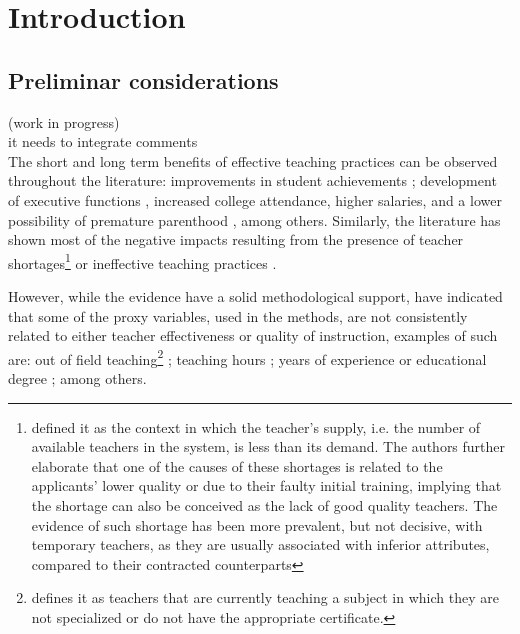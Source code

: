 \chapter{Introduction}

\section{Preliminar considerations}

{\color{red} (work in progress) \\
	it needs to integrate comments \\
	
The short and long term benefits of effective teaching practices can be observed throughout the literature: improvements in student achievements \citet{Rockoff_2004, Rivkin_et_al_2005, Duflo_et_al_2009, Hanushek_et_al_2012, Muralidharan_et_al_2013, Chetty_et_al_2014a, Araujo_et_al_2016}; development of executive functions \cite{Araujo_et_al_2016}, increased college attendance, higher salaries, and a lower possibility of premature parenthood \cite{Chetty_et_al_2014b}, among others. Similarly, the literature has shown most of the negative impacts resulting from the presence of teacher shortages\footnote{\citet{Bertoni_et_al_2020a} defined it as the context in which the teacher's supply, i.e. the number of available teachers in the system, is less than its demand. The authors further elaborate that one of the causes of these shortages is related to the applicants' lower quality or due to their faulty initial training, implying that the shortage can also be conceived as the lack of good quality teachers. The evidence of such shortage has been more prevalent, but not decisive, with temporary teachers, as they are usually associated with inferior attributes, compared to their contracted counterparts} \cite{Duflo_et_al_2009, Muralidharan_et_al_2013, Duflo_et_al_2015, Ayala_2017, Marotta_2019} or ineffective teaching practices \cite{Hanushek_et_al_2012}.

However, while the evidence have a solid methodological support, \citet{Hanushek_et_al_2006} have indicated that some of the proxy variables, used in the methods, are not consistently related to either teacher effectiveness or quality of instruction, examples of such are: out of field teaching\footnote{\citet{Medeiros_et_al_2018} defines it as teachers that are currently teaching a subject in which they are not specialized or do not have the appropriate certificate.} \cite{Ingersoll_1998, Dee_et_al_2008, Bertoni_et_al_2020a}; teaching hours \cite{Bruns_et_al_2015}; years of experience or educational degree \cite{Rockoff_2004, Rivkin_et_al_2005, Clotfelter_et_al_2006, Clotfelter_et_al_2007, Hanushek_et_al_2012}; among others.

}
